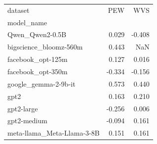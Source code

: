 \begin{tabular}{lrr}
\toprule
dataset & PEW & WVS \\
model_name &  &  \\
\midrule
Qwen_Qwen2-0.5B & 0.029 & -0.408 \\
bigscience_bloomz-560m & 0.443 & NaN \\
facebook_opt-125m & 0.127 & 0.016 \\
facebook_opt-350m & -0.334 & -0.156 \\
google_gemma-2-9b-it & 0.573 & 0.440 \\
gpt2 & 0.163 & 0.210 \\
gpt2-large & -0.256 & 0.006 \\
gpt2-medium & -0.094 & 0.161 \\
meta-llama_Meta-Llama-3-8B & 0.151 & 0.161 \\
\bottomrule
\end{tabular}
